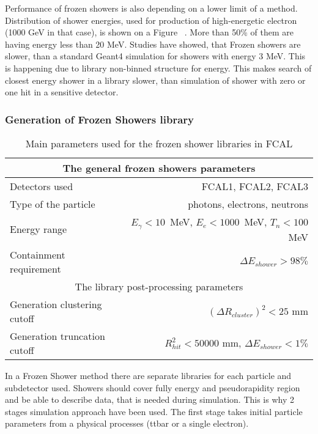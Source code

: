 Performance of frozen showers is also depending on a lower limit of a method. 
Distribution of shower energies, used for production of high-energetic electron (1000 GeV in that case), is shown on a Figure ~. More than 50\% of them are having energy less than 20 MeV. Studies have showed, that Frozen showers are slower, than a standard Geant4 simulation for showers with energy 3 MeV. This is happening due to library non-binned structure for energy. This makes search of closest energy shower in a library slower, than simulation of shower with zero or one hit in a sensitive detector. 

\subsubsection{Generation of Frozen Showers library}

\begin{table}
\centering
\begin{tabular}{l|r}
\hline
\hline
\multicolumn{2}{c}{The general frozen showers parameters} \\
\hline
Detectors used            & FCAL1, FCAL2, FCAL3 \\
Type of the particle      & photons, electrons, neutrons \\
Energy range              &  $E_{\gamma}<10$~MeV,  $E_{e}<1000$~MeV,  $T_n<100$~MeV \\
Containment requirement   & $\Delta E_{shower} > 98\%$\\
\hline
\multicolumn{2}{c}{The library post-processing parameters} \\
\hline
Generation clustering cutoff & $(\Delta R_{cluster})^{2} < 25$ mm\\
Generation truncation cutoff & $R_{hit}^{2} < 50000$ mm, $\Delta E_{shower} < 1\%$\\
\hline
\hline
\end{tabular}
\caption{Main parameters used for the frozen shower libraries in FCAL }
\label{tab:MC_FS_params}
\end{table}

In a Frozen Shower method there are separate libraries for each particle and subdetector used. Showers should cover fully energy and pseudorapidity region and be able to describe data, that is needed during simulation. This is why 2 stages simulation approach have been used. The first stage takes initial particle parameters from a physical processes (ttbar or a single electron). 

